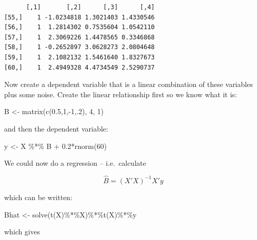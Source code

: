 \documentclass[
  letterpaper,
]{book}
\newenvironment{Shaded}{\begin{snugshade}}{\end{snugshade}}
\newcommand{\DecValTok}[1]{\textcolor[rgb]{0.68,0.00,0.00}{#1}}
\newcommand{\FloatTok}[1]{\textcolor[rgb]{0.68,0.00,0.00}{#1}}
\newcommand{\FunctionTok}[1]{\textcolor[rgb]{0.28,0.35,0.67}{#1}}
\newcommand{\NormalTok}[1]{\textcolor[rgb]{0.00,0.23,0.31}{#1}}
\newcommand{\OtherTok}[1]{\textcolor[rgb]{0.00,0.23,0.31}{#1}}
\newcommand{\SpecialCharTok}[1]{\textcolor[rgb]{0.37,0.37,0.37}{#1}}
\begin{document}
\begin{verbatim}
      [,1]       [,2]      [,3]      [,4]
[55,]    1 -1.0234818 1.3021403 1.4330546
[56,]    1  1.2814302 0.7535604 1.0542110
[57,]    1  2.3069226 1.4478565 0.3346868
[58,]    1 -0.2652897 3.0628273 2.0804648
[59,]    1  2.1082132 1.5461640 1.8327673
[60,]    1  2.4949328 4.4734549 2.5290737
\end{verbatim}

Now create a dependent variable that is a linear combination of these
variables plus some noise. Create the linear relationship first so we
know what it is:

\begin{Shaded}
\begin{Highlighting}[]
\NormalTok{B }\OtherTok{\textless{}{-}} \FunctionTok{matrix}\NormalTok{(}\FunctionTok{c}\NormalTok{(}\FloatTok{0.5}\NormalTok{,}\DecValTok{1}\NormalTok{,}\SpecialCharTok{{-}}\DecValTok{1}\NormalTok{,.}\DecValTok{2}\NormalTok{), }\DecValTok{4}\NormalTok{, }\DecValTok{1}\NormalTok{)}
\end{Highlighting}
\end{Shaded}

and then the dependent variable:

\begin{Shaded}
\begin{Highlighting}[]
\NormalTok{y }\OtherTok{\textless{}{-}}\NormalTok{ X }\SpecialCharTok{\%*\%}\NormalTok{ B }\SpecialCharTok{+} \FloatTok{0.2}\SpecialCharTok{*}\FunctionTok{rnorm}\NormalTok{(}\DecValTok{60}\NormalTok{)}
\end{Highlighting}
\end{Shaded}

We could now do a regression -- i.e.~calculate

\begin{equation}
  \hat B = (X'X)^{-1}X'y
\end{equation}

which can be written:

\begin{Shaded}
\begin{Highlighting}[]
\NormalTok{Bhat }\OtherTok{\textless{}{-}} \FunctionTok{solve}\NormalTok{(}\FunctionTok{t}\NormalTok{(X)}\SpecialCharTok{\%*\%}\NormalTok{X)}\SpecialCharTok{\%*\%}\FunctionTok{t}\NormalTok{(X)}\SpecialCharTok{\%*\%}\NormalTok{y}
\end{Highlighting}
\end{Shaded}

which gives
\end{document}
